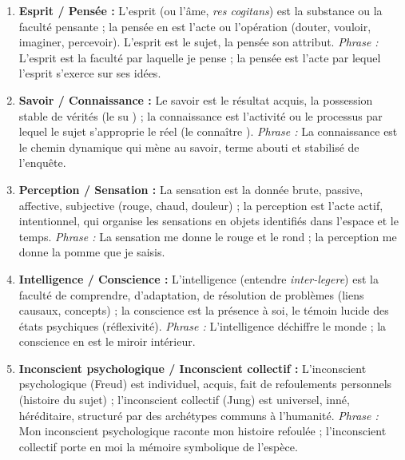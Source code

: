 \documentclass[11pt]{article}
\newcommand{\cle}[1]{{\popxbold\color{popdark}#1}}
\begin{document}
\begin{corrige}
\begin{enumerate}
\item \textbf{Esprit / Pensée :} L'\cle{esprit} (ou l'âme, \emph{res cogitans}) est la \cle{substance} ou la \cle{faculté} pensante ; la \cle{pensée} en est l'\cle{acte} ou l'\cle{opération} (douter, vouloir, imaginer, percevoir). L'esprit est le sujet, la pensée son attribut. \textit{Phrase :} \guillemotleft L'esprit est la faculté par laquelle je pense ; la pensée est l'acte par lequel l'esprit s'exerce sur ses idées. \guillemotright
\item \textbf{Savoir / Connaissance :} Le \cle{savoir} est le \cle{résultat} acquis, la possession stable de vérités (le \guillemotleft su \guillemotright) ; la \cle{connaissance} est l'\cle{activité} ou le \cle{processus} par lequel le sujet s'approprie le réel (le \guillemotleft connaître \guillemotright). \textit{Phrase :} \guillemotleft La connaissance est le chemin dynamique qui mène au savoir, terme abouti et stabilisé de l'enquête. \guillemotright
\item \textbf{Perception / Sensation :} La \cle{sensation} est la donnée brute, passive, affective, subjective (rouge, chaud, douleur) ; la \cle{perception} est l'acte actif, intentionnel, qui organise les sensations en \cle{objets} identifiés dans l'espace et le temps. \textit{Phrase :} \guillemotleft La sensation me donne le rouge et le rond ; la perception me donne la pomme que je saisis. \guillemotright
\item \textbf{Intelligence / Conscience :} L'\cle{intelligence} (entendre \emph{inter-legere}) est la \cle{faculté de comprendre, d'adaptation, de résolution de problèmes} (liens causaux, concepts) ; la \cle{conscience} est la \cle{présence à soi}, le témoin lucide des états psychiques (réflexivité). \textit{Phrase :} \guillemotleft L'intelligence déchiffre le monde ; la conscience en est le miroir intérieur. \guillemotright
\item \textbf{Inconscient psychologique / Inconscient collectif :} L'\cle{inconscient psychologique} (Freud) est \cle{individuel}, acquis, fait de refoulements personnels (histoire du sujet) ; l'\cle{inconscient collectif} (Jung) est \cle{universel}, inné, héréditaire, structuré par des \cle{archétypes} communs à l'humanité. \textit{Phrase :} \guillemotleft Mon inconscient psychologique raconte mon histoire refoulée ; l'inconscient collectif porte en moi la mémoire symbolique de l'espèce. \guillemotright
\end{enumerate}
\end{corrige}
\end{document}
